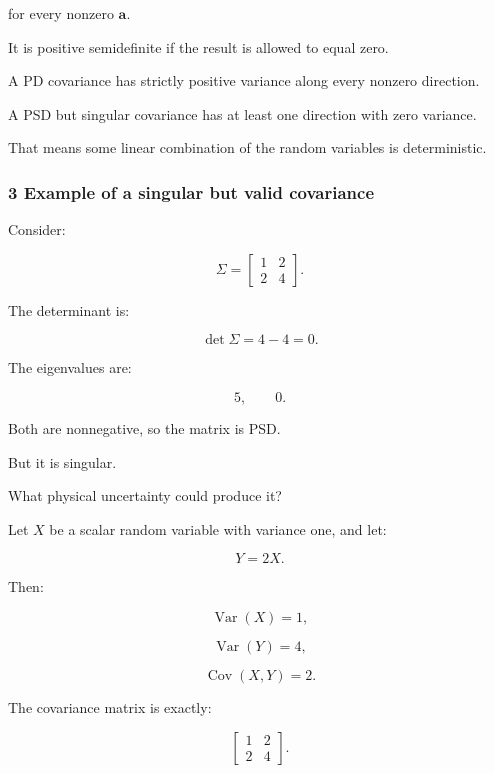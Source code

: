 for every nonzero \(\mathbf a\).

It is positive semidefinite if the result is allowed to equal zero.

A PD covariance has strictly positive variance along every nonzero direction.

A PSD but singular covariance has at least one direction with zero variance.

That means some linear combination of the random variables is deterministic.

\begin{allmightroleexample}

\subsubsection{3 Example of a singular but valid covariance}\label{02-foundations-ii-ch024-example-of-a-singular-but-valid-covariance}

\hypertarget{02-foundations-ii-ch024-example-of-a-singular-but-valid-covariance}{}

Consider:

\end{allmightroleexample}

\[
 \boxed{ \Sigma= \begin{bmatrix} 1&2\\ 2&4 \end{bmatrix} }.
\]

The determinant is:

\[
 \det\Sigma=4-4=0.
\]

The eigenvalues are:

\[
 5,\qquad0.
\]

Both are nonnegative, so the matrix is PSD.

But it is singular.

What physical uncertainty could produce it?

Let \(X\) be a scalar random variable with variance one, and let:

\[
 Y=2X.
\]

Then:

\[
 \operatorname{Var}(X)=1,
\]

\[
 \operatorname{Var}(Y)=4,
\]

\[
 \operatorname{Cov}(X,Y)=2.
\]

The covariance matrix is exactly:

\[
 \begin{bmatrix} 1&2\\2&4 \end{bmatrix}.
\]

